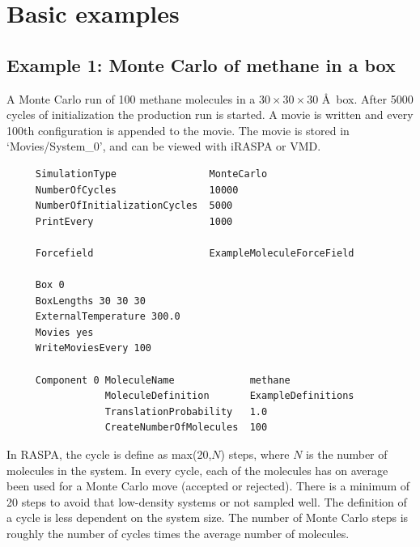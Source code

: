 \section{Basic examples}

\subsection*{Example 1: Monte Carlo of methane in a box}
A Monte Carlo run of 100 methane molecules in a $30\times30\times30$ \AA\ box.
After 5000 cycles of initialization the production run is started.
A movie is written and every 100th configuration is appended to the movie. 
The movie is stored in `Movies/System\_0',
and can be viewed with iRASPA or VMD.

\begin{tiny}
\begin{verbatim}
     SimulationType                MonteCarlo
     NumberOfCycles                10000
     NumberOfInitializationCycles  5000
     PrintEvery                    1000
     
     Forcefield                    ExampleMoleculeForceField
     
     Box 0
     BoxLengths 30 30 30
     ExternalTemperature 300.0
     Movies yes
     WriteMoviesEvery 100
     
     Component 0 MoleculeName             methane
                 MoleculeDefinition       ExampleDefinitions
                 TranslationProbability   1.0
                 CreateNumberOfMolecules  100

\end{verbatim}
\end{tiny}

In RASPA, the cycle is define as max(20,$N$) steps, where $N$ is the number of molecules in the system. In every cycle, each of the molecules
has on average been used for a Monte Carlo move (accepted or rejected). There is a minimum of 20 steps to avoid that low-density
systems or not sampled well. The definition of a cycle is less dependent on the system size. The number of Monte Carlo steps
is roughly the number of cycles times the average number of molecules.

